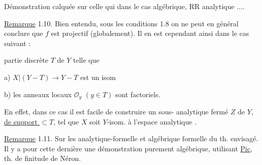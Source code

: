 Démonstration calquée sur celle qui  dans le cas algébrique,  RR analytique ....

\uline{Remarque} 1.10. Bien entendu, sous les conditions 1.8  on ne peut en général conclure que $f$ est projectif (globalement). Il en est cependant ainsi dans le cas suivant :

partie discrète $T$ de $Y$ telle que

a) $X|(Y-T)\longrightarrow Y-T$ est  un isom

b) les anneaux locaux $\mathcal O_y$ $(y\in T)$ sont factoriels.

En effet, dans ce cas il est facile de construire un sous- analytique fermé $Z$ de $Y$, \uline{de support $\subset T$}, tel que $X$ soit $Y$-isom. à l'espace analytique .

\uline{Remarque} 1.11. Sur les  analytique-formelle et algébrique formelle du th. envisagé. Il y a pour cette dernière une démonstration purement algébrique, utilisant \uline{Pic},  th. de finitude de Néron.

